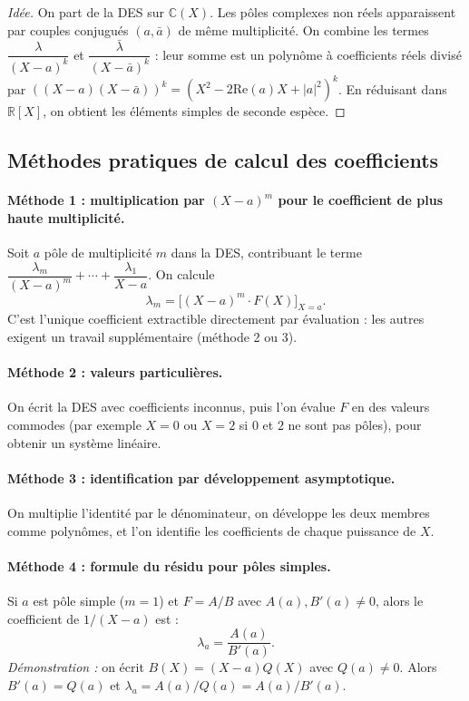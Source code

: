 \documentclass[12pt,a4paper]{report}
\theoremstyle{definition}
\theoremstyle{remark}
\begin{document}
\begin{proof}[Idée]
On part de la DES sur $\mathbb{C}(X)$. Les pôles complexes non réels apparaissent par couples conjugués $(a, \bar{a})$ de même multiplicité. On combine les termes $\dfrac{\lambda}{(X - a)^k}$ et $\dfrac{\bar{\lambda}}{(X - \bar{a})^k}$ : leur somme est un polynôme à coefficients réels divisé par $((X - a)(X - \bar{a}))^k = (X^2 - 2 \mathrm{Re}(a) X + |a|^2)^k$. En réduisant dans $\mathbb{R}[X]$, on obtient les éléments simples de seconde espèce.
\end{proof}

\subsection{Méthodes pratiques de calcul des coefficients}

\paragraph{Méthode 1 : multiplication par $(X - a)^m$ pour le coefficient de plus haute multiplicité.}
Soit $a$ pôle de multiplicité $m$ dans la DES, contribuant le terme $\dfrac{\lambda_m}{(X - a)^m} + \cdots + \dfrac{\lambda_1}{X - a}$.
On calcule
\[ \lambda_m = \big[(X - a)^m \cdot F(X)\big]_{X = a}. \]
C'est l'unique coefficient extractible directement par évaluation : les autres exigent un travail supplémentaire (méthode 2 ou 3).

\paragraph{Méthode 2 : valeurs particulières.}
On écrit la DES avec coefficients inconnus, puis l'on évalue $F$ en des valeurs commodes (par exemple $X = 0$ ou $X = 2$ si $0$ et $2$ ne sont pas pôles), pour obtenir un système linéaire.

\paragraph{Méthode 3 : identification par développement asymptotique.}
On multiplie l'identité par le dénominateur, on développe les deux membres comme polynômes, et l'on identifie les coefficients de chaque puissance de $X$.

\paragraph{Méthode 4 : formule du résidu pour pôles simples.}
Si $a$ est pôle simple ($m = 1$) et $F = A/B$ avec $A(a), B'(a) \neq 0$, alors le coefficient de $1/(X - a)$ est :
\[ \lambda_a = \frac{A(a)}{B'(a)}. \]
\textit{Démonstration :} on écrit $B(X) = (X - a) Q(X)$ avec $Q(a) \neq 0$. Alors $B'(a) = Q(a)$ et $\lambda_a = A(a)/Q(a) = A(a)/B'(a)$.
\end{document}
